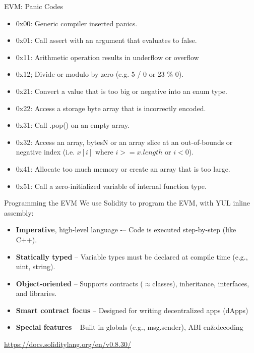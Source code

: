 \documentclass[aspectratio=169]{beamer}
\begin{document}
\begin{frame}{EVM: Panic Codes}
\begin{itemize}
    \item 0x00: Generic compiler inserted panics.
    \item 0x01: Call assert with an argument that evaluates to false.
    \item 0x11: Arithmetic operation results in underflow or overflow
    \item 0x12; Divide or modulo by zero (e.g. 5 / 0 or 23 \% 0).
    \item 0x21: Convert a value that is too big or negative into an enum type.
    \item 0x22: Access a storage byte array that is incorrectly encoded.
    \item 0x31: Call .pop() on an empty array.
    \item 0x32: Access an array, bytesN or an array slice at an out-of-bounds or negative index (i.e. $x[i]$ where $i >= x.length$ or $i < 0$).
    \item 0x41: Allocate too much memory or create an array that is too large.
    \item 0x51: Call a zero-initialized variable of internal function type.
\end{itemize}
\end{frame}


\begin{frame}{Programming the EVM}
We use Solidity to program the EVM, with YUL inline assembly:
\begin{itemize}
    \item \textbf{Imperative}, high-level language -– Code is executed step-by-step (like C++).
    \item \textbf{Statically typed} -- Variable types must be declared at compile time (e.g., uint, string).
    \item \textbf{Object-oriented} -- Supports contracts ($\approx$classes), inheritance, interfaces, and libraries.
    \item \textbf{Smart contract focus} -- Designed for writing decentralized apps (dApps)
    \item \textbf{Special features} -- Built-in globals (e.g., msg.sender), ABI en\&decoding
\end{itemize}
\bigskip

\url{https://docs.soliditylang.org/en/v0.8.30/}
\end{frame}
\end{document}
